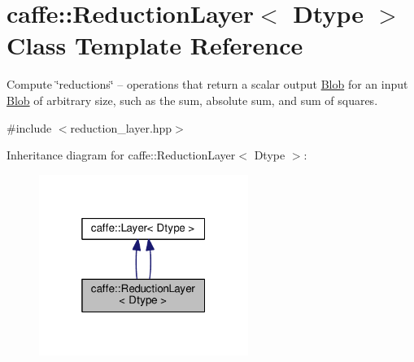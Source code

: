 \hypertarget{classcaffe_1_1_reduction_layer}{}\section{caffe\+:\+:Reduction\+Layer$<$ Dtype $>$ Class Template Reference}
\label{classcaffe_1_1_reduction_layer}


Compute \char`\"{}reductions\char`\"{} -- operations that return a scalar output \mbox{\hyperlink{classcaffe_1_1_blob}{Blob}} for an input \mbox{\hyperlink{classcaffe_1_1_blob}{Blob}} of arbitrary size, such as the sum, absolute sum, and sum of squares.  




{\ttfamily \#include $<$reduction\+\_\+layer.\+hpp$>$}



Inheritance diagram for caffe\+:\+:Reduction\+Layer$<$ Dtype $>$\+:
\nopagebreak
\begin{figure}[H]
\begin{center}
\leavevmode
\includegraphics[width=193pt]{classcaffe_1_1_reduction_layer__inherit__graph}
\end{center}
\end{figure}
